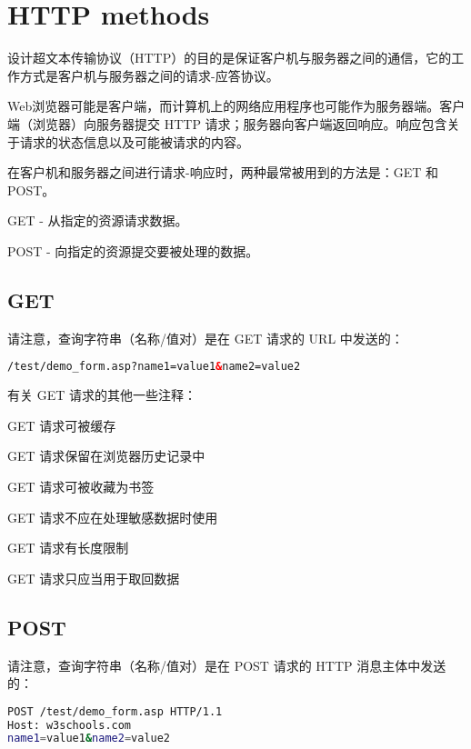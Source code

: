 \part{HTTP methods}


设计超文本传输协议（HTTP）的目的是保证客户机与服务器之间的通信，它的工作方式是客户机与服务器之间的请求-应答协议。

Web浏览器可能是客户端，而计算机上的网络应用程序也可能作为服务器端。客户端（浏览器）向服务器提交 HTTP 请求；服务器向客户端返回响应。响应包含关于请求的状态信息以及可能被请求的内容。


在客户机和服务器之间进行请求-响应时，两种最常被用到的方法是：GET 和 POST。

\begin{compactitem}
\item GET - 从指定的资源请求数据。
\item POST - 向指定的资源提交要被处理的数据。
\end{compactitem}


\chapter{GET}

请注意，查询字符串（名称/值对）是在 GET 请求的 URL 中发送的：

\begin{lstlisting}[language=HTML]
    /test/demo_form.asp?name1=value1&name2=value2
\end{lstlisting}

有关 GET 请求的其他一些注释：

\begin{compactitem}
\item GET 请求可被缓存
\item GET 请求保留在浏览器历史记录中
\item GET 请求可被收藏为书签
\item GET 请求不应在处理敏感数据时使用
\item GET 请求有长度限制
\item GET 请求只应当用于取回数据
\end{compactitem}


\chapter{POST}

请注意，查询字符串（名称/值对）是在 POST 请求的 HTTP 消息主体中发送的：

\begin{lstlisting}[language=bash]
POST /test/demo_form.asp HTTP/1.1
Host: w3schools.com
name1=value1&name2=value2
\end{lstlisting}

